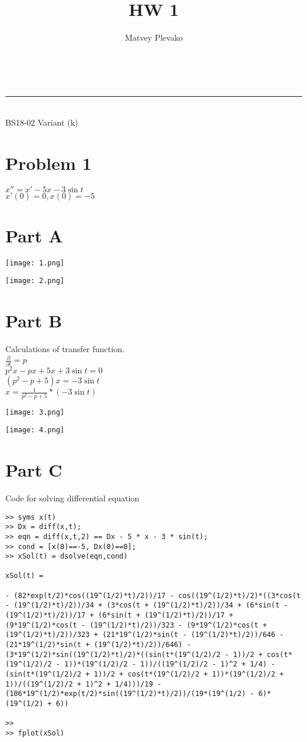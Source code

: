 \documentclass[a4paper,11pt]{article}
\makeatletter
\newcommand{\linia}{\rule{\linewidth}{0.5pt}}
\theoremstyle{mytheor}
\renewcommand{\maketitle}{
\begin{center}
\vspace{2ex}
{\huge \textsc{\@title}}
\vspace{1ex}
\\
\linia\\
\@author \hspace{100ex} BS18-02 \hspace{100ex} Variant (k)

\vspace{4ex}
\end{center}
}
\makeatother
\begin{document}
\title{HW \textnumero{} 1}

\author{Matvey Plevako}

\maketitle


\section*{Problem 1}


$x''= x' - 5 x-3 \sin{t}$ \\
$x'(0)=0,x(0)=-5$


\section*{Part A}

\texttt{[image: 1.png]}

\texttt{[image: 2.png]}


\section*{Part B}
Calculations of transfer function. \\
$\frac{\partial}{\partial t} = p$ \\
$p^2x - px +5x + 3\sin{t} = 0$ \\
$(p^2 - p + 5)x = -3\sin{t}$ \\
$x = \frac{1}{p^2 - p + 5} * (-3\sin{t})$

\texttt{[image: 3.png]}

\texttt{[image: 4.png]}

\section*{Part C}
Code for solving differential equation
\begin{lstlisting}
>> syms x(t)
>> Dx = diff(x,t);
>> eqn = diff(x,t,2) == Dx - 5 * x - 3 * sin(t);
>> cond = [x(0)==-5, Dx(0)==0];
>> xSol(t) = dsolve(eqn,cond)
 
xSol(t) =
 
- (82*exp(t/2)*cos((19^(1/2)*t)/2))/17 - cos((19^(1/2)*t)/2)*((3*cos(t - (19^(1/2)*t)/2))/34 + (3*cos(t + (19^(1/2)*t)/2))/34 + (6*sin(t - (19^(1/2)*t)/2))/17 + (6*sin(t + (19^(1/2)*t)/2))/17 + (9*19^(1/2)*cos(t - (19^(1/2)*t)/2))/323 - (9*19^(1/2)*cos(t + (19^(1/2)*t)/2))/323 + (21*19^(1/2)*sin(t - (19^(1/2)*t)/2))/646 - (21*19^(1/2)*sin(t + (19^(1/2)*t)/2))/646) - (3*19^(1/2)*sin((19^(1/2)*t)/2)*((sin(t*(19^(1/2)/2 - 1))/2 + cos(t*(19^(1/2)/2 - 1))*(19^(1/2)/2 - 1))/((19^(1/2)/2 - 1)^2 + 1/4) - (sin(t*(19^(1/2)/2 + 1))/2 + cos(t*(19^(1/2)/2 + 1))*(19^(1/2)/2 + 1))/((19^(1/2)/2 + 1)^2 + 1/4)))/19 - (106*19^(1/2)*exp(t/2)*sin((19^(1/2)*t)/2))/(19*(19^(1/2) - 6)*(19^(1/2) + 6))
 
>> 
>> fplot(xSol)

\end{lstlisting}
\end{document}
